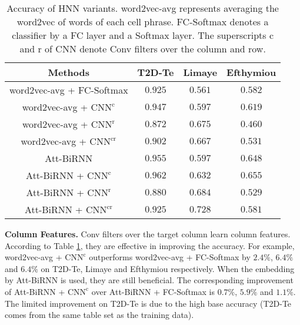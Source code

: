 \documentclass{article}
\begin{document}
\begin{table}[h!]
\scriptsize{
\centering
\begin{tabular}[t]{c|c|c|c}
\hline
Methods & T2D-Te & Limaye & Efthymiou    \\\hline 
word2vec-avg + FC-Softmax & $0.925$  & $0.561$ & $0.582$ \\\hline
word2vec-avg + $\text{CNN}^{\text{c}}$ & $\bm{0.947}$  & $0.597$ & $\bm{0.619}$  \\
word2vec-avg + $\text{CNN}^{\text{r}}$ & $0.872$  & $\bm{0.675}$ & $0.460$ \\
word2vec-avg + $\text{CNN}^{\text{cr}}$ & $0.902$ & $0.667$ & $0.531$  \\\hline\hline
Att-BiRNN &$0.955$  & $0.597$ & $0.648$ \\\hline
Att-BiRNN + $\text{CNN}^{\text{c}}$ &$\bm{0.962}$  & $0.632$ & $\bm{0.655}$  \\
Att-BiRNN + $\text{CNN}^{\text{r}}$ &$0.880$  & $0.684$ & $0.529$  \\
Att-BiRNN + $\text{CNN}^{\text{cr}}$ & $0.925$ & $\bm{0.728}$  & $0.581$ \\\hline
\end{tabular}
\vspace{-0.2cm}
\caption{\footnotesize
\label{res:hnn}
Accuracy of HNN variants. 
word2vec-avg represents averaging the word2vec of words of each cell phrase.
FC-Softmax denotes a classifier by a FC layer and a Softmax layer.
The superscripts c and r of CNN denote Conv filters over the column and row.
}
}
\end{table}
\vspace{-0.2cm}

\noindent \textbf{Column Features.}
Conv filters over the target column learn column features.
According to Table \ref{res:hnn}, they are effective in improving the accuracy.  
For example, word2vec-avg + $\text{CNN}^{\text{c}}$ outperforms word2vec-avg + FC-Softmax  
by $2.4\%$, $6.4\%$ and $6.4\%$ on T2D-Te, Limaye and Efthymiou respectively.
When the embedding by Att-BiRNN is used, 
they are still beneficial. 
The corresponding improvement of Att-BiRNN + $\text{CNN}^{\text{c}}$ over Att-BiRNN + FC-Softmax is $0.7\%$, $5.9\%$ and $1.1\%$.
The limited improvement on T2D-Te is due to the high base accuracy (T2D-Te comes from the same table set as the training data).
\end{document}
